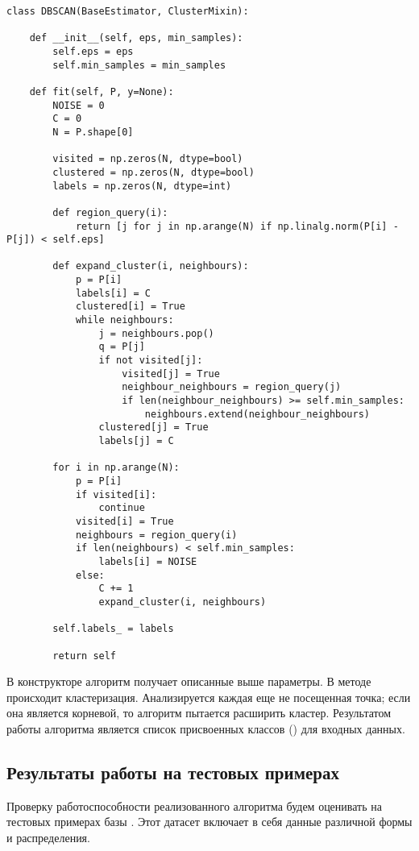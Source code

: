 \begin{lstlisting}
class DBSCAN(BaseEstimator, ClusterMixin):

    def __init__(self, eps, min_samples):
        self.eps = eps
        self.min_samples = min_samples

    def fit(self, P, y=None):
        NOISE = 0
        C = 0
        N = P.shape[0]
        
        visited = np.zeros(N, dtype=bool)
        clustered = np.zeros(N, dtype=bool)
        labels = np.zeros(N, dtype=int)
        
        def region_query(i):
            return [j for j in np.arange(N) if np.linalg.norm(P[i] - P[j]) < self.eps]
        
        def expand_cluster(i, neighbours):
            p = P[i]
            labels[i] = C
            clustered[i] = True
            while neighbours:
                j = neighbours.pop()
                q = P[j]
                if not visited[j]:
                    visited[j] = True
                    neighbour_neighbours = region_query(j)
                    if len(neighbour_neighbours) >= self.min_samples:
                        neighbours.extend(neighbour_neighbours)
                clustered[j] = True
                labels[j] = C

        for i in np.arange(N):
            p = P[i]
            if visited[i]:
                continue
            visited[i] = True
            neighbours = region_query(i)
            if len(neighbours) < self.min_samples:
                labels[i] = NOISE
            else:
                C += 1
                expand_cluster(i, neighbours)

        self.labels_ = labels
        
        return self
\end{lstlisting}

В конструкторе алгоритм получает описанные выше параметры. В методе  происходит кластеризация. Анализируется каждая еще не посещенная точка; если она является корневой, то алгоритм пытается расширить кластер. Результатом работы алгоритма является список присвоенных классов () для входных данных.

\subsection{Результаты работы на тестовых примерах}

Проверку работоспособности реализованного алгоритма  будем оценивать на тестовых примерах базы \cite{data}. Этот датасет включает в себя данные различной формы и распределения.

